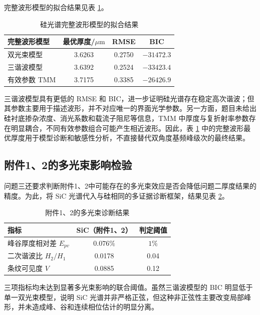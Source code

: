 \documentclass[withoutpreface,bwprint]{cumcmthesis}
\begin{document}
完整波形模型的拟合结果见表 \ref{tab:q3_full_waveform_results}。

\begin{table}[htbp]
	\centering
	\caption{硅光谱完整波形模型的拟合结果}
	\label{tab:q3_full_waveform_results}
	\begin{tabular}{lccc}
		\toprule
		完整波形模型 &
		最优厚度/$\mu\mathrm{m}$ &
		RMSE &
		BIC \\
		\midrule
		双光束模型 & 3.6263 & 0.2750 & $-31472.3$ \\
		三谐波模型 & 3.6392 & 0.2524 & $-33423.4$ \\
		有效参数 TMM & 3.7175 & 0.3385 & $-26426.9$ \\
		\bottomrule
	\end{tabular}
\end{table}

三谐波模型具有更低的 RMSE 和 BIC，进一步证明硅光谱存在稳定高次谐波；但其参数主要用于描述波形，并不对应唯一的界面光学参数。另一方面，题目未给出硅衬底掺杂浓度、消光系数和载流子阻尼等信息，TMM 中厚度与复折射率参数存在明显耦合，不同有效参数组合可能产生相近波形。因此，表 \ref{tab:q3_full_waveform_results} 中的完整波形最优厚度用于模型诊断和敏感性分析，不直接替代双角度基频峰级次的最终结果。

\subsection{附件1、2的多光束影响检验}
\label{subsec:q3_sic_check}

问题三还要求判断附件1、2中可能存在的多光束效应是否会降低问题二厚度结果的精度。为此，将 SiC 光谱代入与硅相同的多证据诊断框架，结果见表 \ref{tab:q3_sic_diagnostics}。

\begin{table}[htbp]
	\centering
	\caption{附件1、2的多光束诊断结果}
	\label{tab:q3_sic_diagnostics}
	\begin{tabular}{lcc}
		\toprule
		指标 & SiC（附件1、2） & 判定阈值 \\
		\midrule
		峰谷厚度相对差 $E_{pv}$ & $0.076\%$ & $1\%$ \\
		二次谐波比 $H_2/H_1$ & 0.0178 & 0.04 \\
		条纹可见度 $V$ & 0.0885 & 0.12 \\
		\bottomrule
	\end{tabular}
\end{table}

三项指标均未达到显著多光束影响的联合阈值。虽然三谐波模型的 BIC 明显低于单一双光束模型，说明 SiC 光谱并非严格正弦，但这种非正弦性主要改变局部峰形，并未造成峰、谷和连续相位估计的明显分离。
\end{document}
